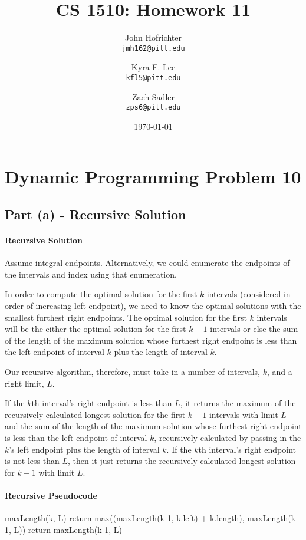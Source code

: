 \documentclass[12pt]{article}
\title{CS 1510: Homework 11}
\author{
John Hofrichter\\\texttt{jmh162@pitt.edu}
\and
Kyra F. Lee \\\texttt{kfl5@pitt.edu}
\and
Zach Sadler \\\texttt{zps6@pitt.edu}}
\date{\today}
\begin{document}
\maketitle
\section*{Dynamic Programming Problem 10}
	\subsection*{Part (a) - Recursive Solution}
		\paragraph*{Recursive Solution}
			Assume integral endpoints. Alternatively, we could enumerate the endpoints of the intervals and
			index using that enumeration.
			
			In order to compute the optimal solution for the first $k$ intervals (considered in order of
			increasing left endpoint), we need to know the optimal solutions with the smallest furthest right
			endpoints. The optimal solution for the first $k$ intervals will be the either the optimal
			solution for the first $k-1$ intervals or else the sum of the length of the maximum solution
			whose furthest right endpoint is less than the left endpoint of interval $k$ plus the length of
			interval $k$.
			
			Our recursive algorithm, therefore, must take in a number of intervals, $k$, and a right limit, $L$.
			
			If the $k$th interval's right endpoint is less than $L$, it returns the maximum of the recursively
			calculated longest solution for the first $k-1$ intervals with limit $L$ and the sum of the length of
			the maximum solution whose furthest right endpoint is less than the left endpoint of interval $k$,
			recursively calculated by passing in the $k$'s left endpoint plus the length of interval $k$. If the
			$k$th interval's right endpoint is not less than $L$, then it just returns the recursively
			calculated longest solution for $k-1$ with limit $L$.
			
		\paragraph*{Recursive Pseudocode}
			\begin{algorithmic}
				\STATE maxLength(k, L)
						\STATE return max((maxLength(k-1, k.left) + k.length), maxLength(k-1, L))
					\ELSE
						\STATE return maxLength(k-1, L)
					\ENDIF
			\end{algorithmic}
			
\end{document}
